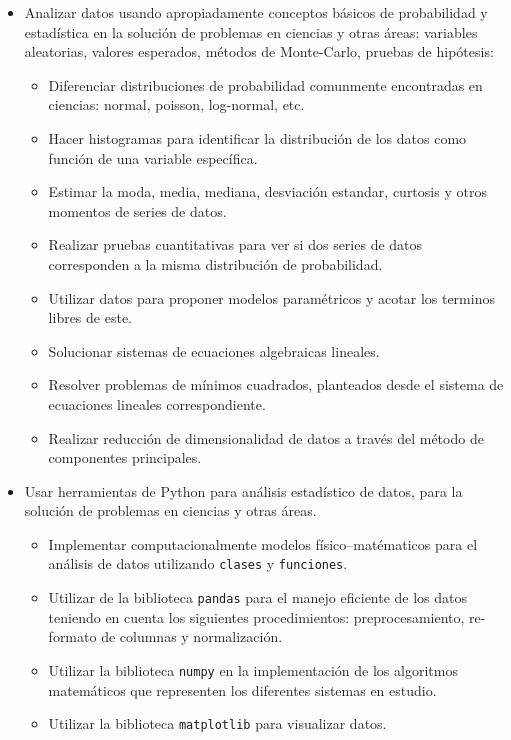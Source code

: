 \documentclass[letterpaper,10pt,onecolumn]{article}
\begin{document}
\begin{itemize}
\item Analizar datos usando apropiadamente conceptos
  b\'asicos de probabilidad y estad\'istica en la soluci\'on de
  problemas en ciencias y otras \'areas: variables aleatorias, valores
  esperados, m\'etodos de Monte-Carlo, pruebas de hip\'otesis: 
 \begin{itemize}
  \item Diferenciar distribuciones de probabilidad comunmente
    encontradas en ciencias: normal, poisson, log-normal, etc. 
  \item Hacer histogramas para identificar la distribuci\'on de los
    datos como funci\'on de una variable espec\'ifica. 
  \item Estimar la moda, media, mediana, desviaci\'on estandar,
    curtosis y otros momentos de series de datos. 
  \item Realizar pruebas cuantitativas para ver si dos series de datos
    corresponden a la misma distribuci\'on de probabilidad. 
  \item Utilizar datos para proponer modelos param\'etricos y acotar
    los terminos libres de este.  
  \item Solucionar sistemas de ecuaciones algebraicas lineales.  
  \item Resolver problemas de m\'inimos cuadrados, planteados desde el
    sistema de ecuaciones lineales correspondiente. 
  \item Realizar reducci\'on de dimensionalidad de datos a trav\'es
    del m\'etodo de componentes principales. 
 \end{itemize}
\item Usar herramientas de Python para an\'alisis estad\'istico de
  datos, para la soluci\'on de problemas en ciencias y otras
  \'areas.\\[-0.6cm] 
\begin{itemize}
   \item Implementar computacionalmente modelos f\'isico--mat\'ematicos
     para el an\'alisis de datos utilizando \texttt{clases} y
     \texttt{funciones}.\\[-0.5cm] 
    \item Utilizar de la biblioteca \texttt{pandas} para el manejo eficiente de los datos
    teniendo en cuenta los siguientes procedimientos: preprocesamiento, re-formato de
    columnas y normalizaci\'on.\\[-0.5cm] 
   \item Utilizar la biblioteca \texttt{numpy} en la implementaci\'on
     de los algoritmos matem\'aticos que representen los diferentes
     sistemas en estudio.\\[-0.5cm] 
    \item  Utilizar la biblioteca \texttt{matplotlib} para visualizar
      datos.\\[-0.5cm] 
\end{itemize}


\end{itemize}
\end{document}
